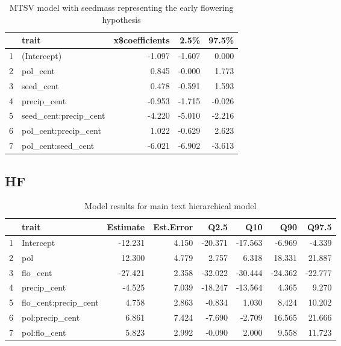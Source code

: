 \documentclass[11pt]{article}\usepackage[]{graphicx}\usepackage[]{color}
\begin{document}
\begin{table}[H]
\centering
\begin{tabular}{rlrrr}
  \hline
 & trait & x\$coefficients & 2.5\% & 97.5\% \\ 
  \hline
1 & (Intercept) & -1.097 & -1.607 & 0.000 \\ 
  2 & pol\_cent & 0.845 & -0.000 & 1.773 \\ 
  3 & seed\_cent & 0.478 & -0.591 & 1.593 \\ 
  4 & precip\_cent & -0.953 & -1.715 & -0.026 \\ 
  5 & seed\_cent:precip\_cent & -4.220 & -5.010 & -2.216 \\ 
  6 & pol\_cent:precip\_cent & 1.022 & -0.629 & 2.623 \\ 
  7 & pol\_cent:seed\_cent & -6.021 & -6.902 & -3.613 \\ 
   \hline
\end{tabular}
\caption{MTSV model with seedmass representing the early flowering hypothesis} 
\label{seed_mtsv_physilogical}
\end{table}

\subsection*{HF}

\begin{table}[H]
\centering
\begin{tabular}{rlrrrrrr}
  \hline
 & trait & Estimate & Est.Error & Q2.5 & Q10 & Q90 & Q97.5  \\ 
  \hline
1 & Intercept & -12.231 & 4.150 & -20.371 & -17.563 & -6.969 & -4.339  \\ 
  2 & pol & 12.300 & 4.779 & 2.757 & 6.318 & 18.331 & 21.887 \\ 
  3 & flo\_cent & -27.421 & 2.358 & -32.022 & -30.444 & -24.362 & -22.777  \\ 
  4 & precip\_cent & -4.525 & 7.039 & -18.247 & -13.564 & 4.365 & 9.270  \\ 
  5 & flo\_cent:precip\_cent & 4.758 & 2.863 & -0.834 & 1.030 & 8.424 & 10.202 \\ 
  6 & pol:precip\_cent & 6.861 & 7.424 & -7.690 & -2.709 & 16.565 & 21.666  \\ 
  7 & pol:flo\_cent & 5.823 & 2.992 & -0.090 & 2.000 & 9.558 & 11.723  \\ 
   \hline
\end{tabular}
\caption{Model results for main text hierarchical model} 
\label{HF_phys_main}
\end{table}
\end{document}
